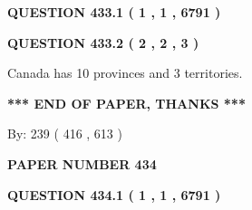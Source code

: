 \documentclass[12pt]{article}
\begin{document}
   
 \vspace{0.2in}
 
 
 
 
   
   
  
\vspace{0.2in}
  
{\textbf{\Large{QUESTION
433.1 
 ( 1 , 1 , 6791 )
}}}
  
  
  
\vspace{0.2in}
  
{\textbf{\Large{QUESTION
433.2 
 ( 2 , 2 , 3 )
}}}
  
  
 
 
\noindent{}
 
 
Canada has 10  provinces and 3 territories.
 
 
 
 
   
   
 \vspace{0.2in}
 
   
   
   
   
\vspace{1.0in} 
{\textbf{\large{ *** END OF PAPER, THANKS *** }}} 
   
   
\hspace{1.0in} By: 
 239 ( 416 ,  613 )
   
   
   
   
\newpage 
\setcounter{page}{ 
   434001 } 
   
   
   
   
 {\textbf{ \Large{ PAPER NUMBER  434  }}}
   
   
\vspace{0.2in}
   
   
   
   
   
   
 \vspace{0.2in}
 
 
 
 
   
   
  
\vspace{0.2in}
  
{\textbf{\Large{QUESTION
434.1 
 ( 1 , 1 , 6791 )
}}}
  
  
  
\end{document}
